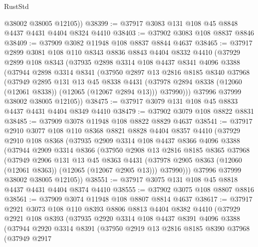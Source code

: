 \begin{lexlean}{RustStd}
\begin{coremodule}
        @38002
        @38005
        @12105))
@38399 := @37917 @3083 @131 @108 @45 @8848 @4437 @4431 @4404 @8324 @4410
@38403 := @37902 @3083 @108 @8837 @8846
@38409 := @37909 @3082 @11948 @108 @8837 @8844 @4637
@38465 := @37917
    @2899
    @3081
    @108
    @110
    @8343
    @8836
    @8843
    @4404
    @8332
    @4410
    (@37929
      @2899
      @108
      @8343
      (@37935
        @2898
        @3314
        @108
        @4437
        @8341
        @4096
        @3388
        (@37944
          @2898
          @3314
          @8341
          (@37950
            @2897
            @13
            @2816
            @8185
            @8340
            @37968
            (@37949
              @2895
              @131
              @13
              @45
              @8338
              @4431
              (@37978 @2894 @8338 (@12060 (@12061 @8338)) (@12065 (@12067 @2894 @13)))
              @37990)))
        @37996
        @37999
        @38002
        @38005
        @12105))
@38475 := @37917 @3079 @131 @108 @45 @8833 @4437 @4431 @4404 @8349 @4410
@38479 := @37902 @3079 @108 @8822 @8831
@38485 := @37909 @3078 @11948 @108 @8822 @8829 @4637
@38541 := @37917
    @2910
    @3077
    @108
    @110
    @8368
    @8821
    @8828
    @4404
    @8357
    @4410
    (@37929
      @2910
      @108
      @8368
      (@37935
        @2909
        @3314
        @108
        @4437
        @8366
        @4096
        @3388
        (@37944
          @2909
          @3314
          @8366
          (@37950
            @2908
            @13
            @2816
            @8185
            @8365
            @37968
            (@37949
              @2906
              @131
              @13
              @45
              @8363
              @4431
              (@37978 @2905 @8363 (@12060 (@12061 @8363)) (@12065 (@12067 @2905 @13)))
              @37990)))
        @37996
        @37999
        @38002
        @38005
        @12105))
@38551 := @37917 @3075 @131 @108 @45 @8818 @4437 @4431 @4404 @8374 @4410
@38555 := @37902 @3075 @108 @8807 @8816
@38561 := @37909 @3074 @11948 @108 @8807 @8814 @4637
@38617 := @37917
    @2921
    @3073
    @108
    @110
    @8393
    @8806
    @8813
    @4404
    @8382
    @4410
    (@37929
      @2921
      @108
      @8393
      (@37935
        @2920
        @3314
        @108
        @4437
        @8391
        @4096
        @3388
        (@37944
          @2920
          @3314
          @8391
          (@37950
            @2919
            @13
            @2816
            @8185
            @8390
            @37968
            (@37949
              @2917

\end{coremodule}
\end{lexlean}
